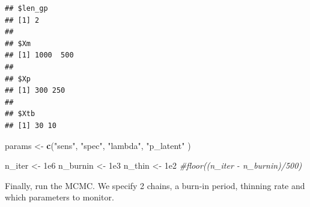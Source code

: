 \documentclass[]{article}
\newenvironment{Shaded}{\begin{snugshade}}{\end{snugshade}}
\newcommand{\CommentTok}[1]{\textcolor[rgb]{0.56,0.35,0.01}{\textit{#1}}}
\newcommand{\DataTypeTok}[1]{\textcolor[rgb]{0.13,0.29,0.53}{#1}}
\newcommand{\FloatTok}[1]{\textcolor[rgb]{0.00,0.00,0.81}{#1}}
\newcommand{\KeywordTok}[1]{\textcolor[rgb]{0.13,0.29,0.53}{\textbf{#1}}}
\newcommand{\NormalTok}[1]{#1}
\newcommand{\OperatorTok}[1]{\textcolor[rgb]{0.81,0.36,0.00}{\textbf{#1}}}
\newcommand{\OtherTok}[1]{\textcolor[rgb]{0.56,0.35,0.01}{#1}}
\newcommand{\StringTok}[1]{\textcolor[rgb]{0.31,0.60,0.02}{#1}}
\begin{document}
\begin{Shaded}
\end{Shaded}

\begin{verbatim}
## $len_gp
## [1] 2
## 
## $Xm
## [1] 1000  500
## 
## $Xp
## [1] 300 250
## 
## $Xtb
## [1] 30 10
\end{verbatim}

\begin{Shaded}
\begin{Highlighting}[]
\NormalTok{params <-}
\StringTok{  }\KeywordTok{c}\NormalTok{(}\StringTok{"sens"}\NormalTok{, }\StringTok{"spec"}\NormalTok{,}
    \StringTok{"lambda"}\NormalTok{,}
    \StringTok{"p_latent"}
\NormalTok{  )}

\NormalTok{n_iter <-}\StringTok{ }\FloatTok{1e6}
\NormalTok{n_burnin <-}\StringTok{ }\FloatTok{1e3}
\NormalTok{n_thin <-}\StringTok{ }\FloatTok{1e2} \CommentTok{#floor((n_iter - n_burnin)/500)}
\end{Highlighting}
\end{Shaded}

Finally, run the MCMC. We specify 2 chains, a burn-in period, thinning
rate and which parameters to monitor.
\end{document}
